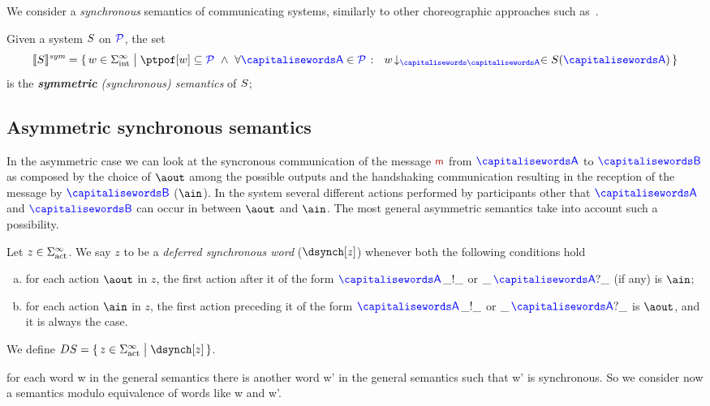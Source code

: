 We consider a \emph{synchronous} semantics of
communicating systems, similarly to other choreographic approaches
such as~\cite{BravettiZ07,CarboneHY12,Dezani-Ciancaglini16,SeveriD19}.

\begin{definition}\label{def:syncSem}
  Given a system $S$ on $\mathcal{\color{blue}{P}}$, the set
  \[
	 \ssem{\aCS} = \Set{\acword \in \alfint^\infty \sst  \ptpof[\acword] \subseteq \ptpset \ \land\ \forall \p \in
		\ptpset \qst \ \proj{\acword}{\p} \in \aCS(\p)}
  \]
  is the \emph{{\bf symmetric} (synchronous) semantics} of $S$;
\end{definition}

\subsection{Asymmetric synchronous semantics}

In the asymmetric case we can look at the syncronous communication of the message $\msg$
from $\p$ to $\q$ as composed by the choice of $\aout$ among the possible outputs and the
handshaking communication resulting in the reception of the message by $\q$ ($\ain$).
In the system several different actions performed by participants other that $\p$ and $\q$
can occur in between $\aout$ and $\ain$. The most general asymmetric semantics take into account
such a possibility. 
 

\begin{definition}
Let $z\in\Sigma_{\text{act}}^{\infty}$. We say $z$ to be a {\em deferred synchronous word} ($\dsynch[z]$) whenever both the following conditions hold
\begin{enumerate}[a)]
\item 
for each action $\aout$ in $z$, the first action after it of the form $\p\,\_!\_$ or  $\_\,\p?\_$ (if any) is $\ain$;
\item
for each action $\ain$ in $z$, the first action preceding it of the form $\p\,\_!\_$ or  $\_\,\p?\_$ is $\aout$, and it is always the case.
\end{enumerate}
We define $DS=\Set{z\in\alfact^\infty \sst \dsynch[z]}$.
\end{definition}


for each word w in the general semantics there is another word w' in the general semantics
such that w' is synchronous.
So we consider now a semantics modulo equivalence of words like w and w'.



